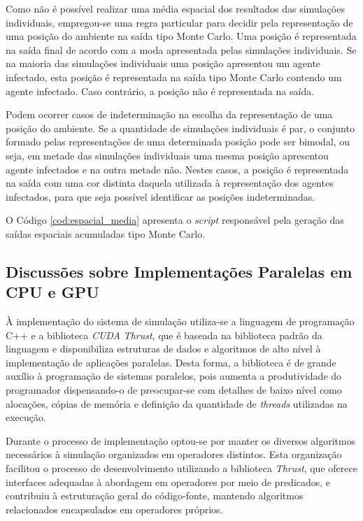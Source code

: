 Como não é possível realizar uma média espacial dos resultados das simulações individuais, empregou-se uma regra particular para decidir pela representação de uma posição do ambiente na saída tipo Monte Carlo. Uma posição é representada na saída final de acordo com a moda apresentada pelas simulações individuais. Se na maioria das simulações individuais uma posição apresentou um agente infectado, esta posição é representada na saída tipo Monte Carlo contendo um agente infectado. Caso contrário, a posição não é representada na saída. 

Podem ocorrer casos de indeterminação na escolha da representação de uma posição do ambiente. Se a quantidade de simulações individuais é par, o conjunto formado pelas representações de uma determinada posição pode ser bimodal, ou seja, em metade das simulações individuais uma mesma posição apresentou agente infectados e na outra metade não. Nestes casos, a posição é representada na saída com uma cor distinta daquela utilizada à representação dos agentes infectados, para que seja possível identificar as posições indeterminadas. 

O Código \ref{cod:espacial_media} apresenta o \textit{script} responsável pela geração das saídas espaciais acumuladas tipo Monte Carlo. 
 


\subsection{Discussões sobre Implementações Paralelas em CPU e GPU} 

À implementação do sistema de simulação utiliza-se a linguagem de programação C++ e a biblioteca \textit{CUDA} \textit{Thrust}, que é baseada na biblioteca padrão da linguagem e disponibiliza estruturas de dados e algoritmos de alto nível à implementação de aplicações paralelas. Desta forma, a biblioteca é de grande auxílio à programação de sistemas paralelos, pois aumenta a produtividade do programador dispensando-o de preocupar-se com detalhes de baixo nível como alocações, cópias de memória e definição da quantidade de \textit{threads} utilizadas na execução. 

Durante o processo de implementação optou-se por manter os diversos algoritmos necessários à simulação organizados em operadores distintos. Esta organização facilitou o processo de desenvolvimento utilizando a biblioteca \textit{Thrust}, que oferece interfaces adequadas à abordagem em operadores por meio de predicados, e contribuiu à estruturação geral do código-fonte, mantendo algoritmos relacionados encapsulados em operadores próprios. 

